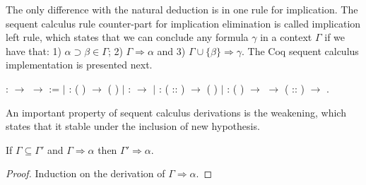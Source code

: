 The only difference with the natural deduction is in one rule for implication. The
sequent calculus rule counter-part for implication elimination is called
implication left rule, which states that we can conclude any formula $\gamma$
in a context $\Gamma$ if we have that: 1) $\alpha \supset \beta \in \Gamma$;
2) $\Gamma \Rightarrow \alpha$ and 3) $\Gamma \cup \{\beta\} \Rightarrow
\gamma$. The Coq sequent calculus implementation is presented next.
 \begin{coqdoccode}
\coqdocemptyline
\coqdocnoindent
{}  : \coqdocvar{$\Gamma$} \ensuremath{\rightarrow} \coqdocvar{$\alpha$} \ensuremath{\rightarrow}  :=\coqdoceol
\coqdocnoindent
\ensuremath{|}   \coqdoceol
\coqdocindent{1.00em}
: ( ) \coqdocvar{$\in$}  \ensuremath{\rightarrow}   ( )\coqdoceol
\coqdocnoindent
\ensuremath{|}   \coqdoceol
\coqdocindent{1.00em}
:  \coqdocvar{$\in$}  \ensuremath{\rightarrow}   \coqdoceol
\coqdocnoindent
\ensuremath{|}    \coqdoceol
\coqdocindent{1.00em}
:  ( :: )  \ensuremath{\rightarrow}\coqdoceol
\coqdocindent{2.00em}
  (  )\coqdoceol
\coqdocnoindent
\ensuremath{|}     \coqdoceol
\coqdocindent{1.00em}
: (  ) \coqdocvar{$\in$}  \ensuremath{\rightarrow}\coqdoceol
\coqdocindent{2.00em}
   \ensuremath{\rightarrow}\coqdoceol
\coqdocindent{2.00em}
 ( :: )  \ensuremath{\rightarrow}\coqdoceol
\coqdocindent{2.00em}
  .\coqdoceol
\coqdocemptyline
\end{coqdoccode}
An important property of sequent calculus derivations is the weakening, which
states that it stable under the inclusion of new hypothesis.

\begin{Lemma}[Weakening]\label{lemma:weak}
If $\Gamma \subseteq \Gamma'$ and $\Gamma\Rightarrow \alpha$ then $\Gamma'\Rightarrow \alpha$.
\end{Lemma}
\begin{proof}
  Induction on the derivation of $\Gamma\Rightarrow\alpha$.
\end{proof}

